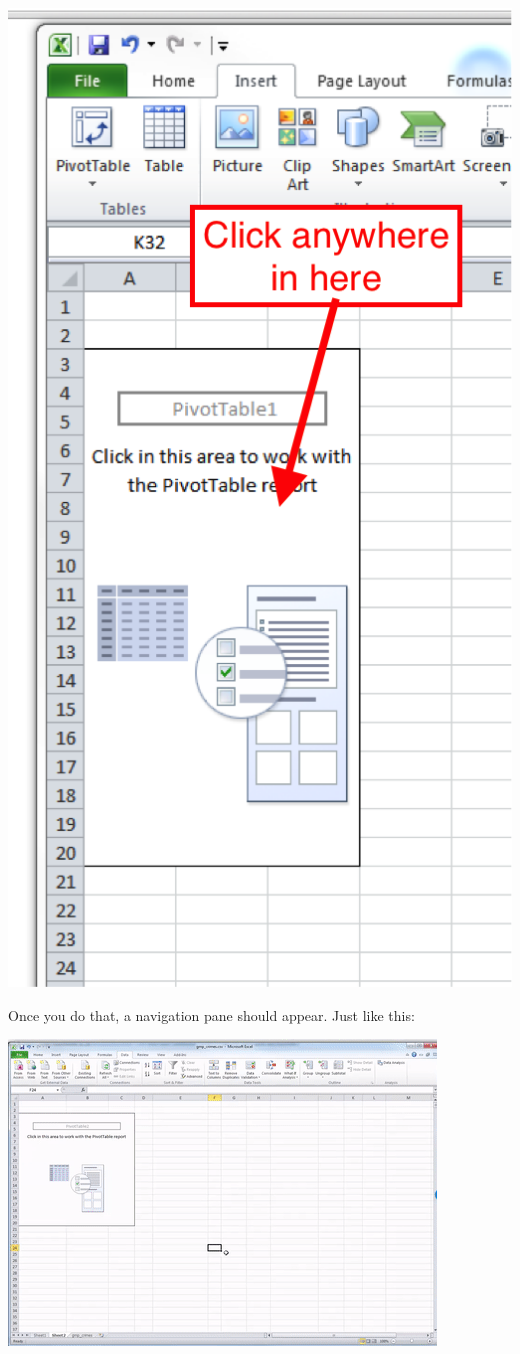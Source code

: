 \documentclass[]{book}
\theoremstyle{definition}
\theoremstyle{definition}
\theoremstyle{definition}
\theoremstyle{remark}
\begin{document}
\includegraphics{imgs/pivot_shell.png}

Once you do that, a navigation pane should appear. Just like this:

\includegraphics{imgs/click_pivot_activate.gif}
\end{document}
